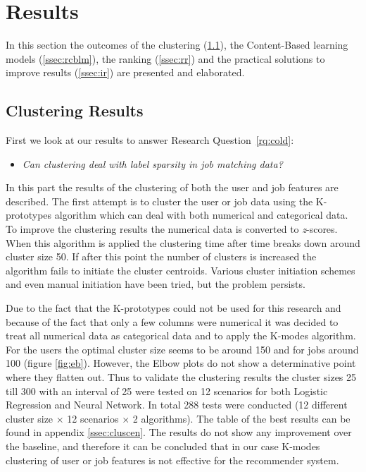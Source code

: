 \section{Results}
\label{sec:rslts}

In this section the outcomes of the clustering (\ref{ssec:clures}), the Content-Based learning models (\ref{ssec:rcblm}), the ranking (\ref{ssec:rr}) and the practical solutions to improve results (\ref{ssec:ir}) are presented and elaborated.

\subsection{Clustering Results}
\label{ssec:clures}

First we look at our results to answer Research Question~\ref{rq:cold}:
\begin{itemize}
	\item[] \em Can clustering deal with label sparsity in job matching data?
\end{itemize}

\noindent In this part the results of the clustering of both the user and job features are described.
The first attempt is to cluster the user or job data using the K-prototypes algorithm which can deal with both numerical and categorical data.
To improve the clustering results the numerical data is converted to \textit{z}-scores.
When this algorithm is applied the clustering time after time breaks down around cluster size 50. If after this point the number of clusters is increased the algorithm fails to initiate the cluster centroids.
Various cluster initiation schemes and even manual initiation have been tried, but the problem persists.

Due to the fact that the K-prototypes could not be used for this research and because of the fact that only a few columns were numerical it was decided to treat all numerical data as categorical data and to apply the K-modes algorithm.
For the users the optimal cluster size seems to be around 150 and for jobs around 100 (figure \ref{fig:eb}).
However, the Elbow plots do not show a determinative point where they flatten out.
Thus to validate the clustering results the cluster sizes 25 till 300 with an interval of 25 were tested on 12 scenarios for both Logistic Regression and Neural Network.
In total 288 tests were conducted (12 different cluster size $\times$ 12 scenarios $\times$ 2 algorithms). 
The table of the best results can be found in appendix \ref{ssec:cluscen}.
The results do not show any improvement over the baseline, and therefore it can be concluded that in our case K-modes clustering of user or job features is not effective for the recommender system.

